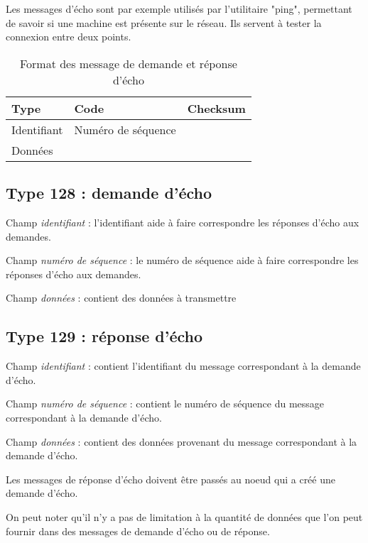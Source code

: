Les messages d'écho sont par exemple utilisés par l'utilitaire "ping", permettant de savoir si une machine est présente sur le réseau. Ils servent à tester la connexion entre deux points.

\begin{table}[!h]
  \centering
  \begin{tabular}{|l|l|l|} 
   \hline
   	Type & Code & Checksum \\
    \hline
    Identifiant & Numéro de séquence & \\
    \hline
    Données & & \\
    \hline
  \end{tabular}
  \caption{Format des message de demande et réponse d'écho \cite{}}
\end{table}

\subsection{Type 128 : demande d'écho}

Champ \emph{identifiant} : l'identifiant aide à faire correspondre les réponses d'écho aux demandes.

Champ \emph{numéro de séquence} : le numéro de séquence aide à faire correspondre les réponses d'écho aux demandes.    

Champ \emph{données} : contient des données à transmettre

\subsection{Type 129 : réponse d'écho}

Champ \emph{identifiant} : contient l'identifiant du message correspondant à la demande d'écho.

Champ \emph{numéro de séquence} : contient le numéro de séquence du message correspondant à la demande d'écho.   

Champ \emph{données} : contient des données provenant du message correspondant à la demande d'écho.
\medskip

Les messages de réponse d'écho doivent être passés au noeud qui a créé une demande d'écho. 
    
On peut noter qu'il n'y a pas de limitation à la quantité de données que l'on peut fournir dans des messages de demande d'écho ou de réponse.
